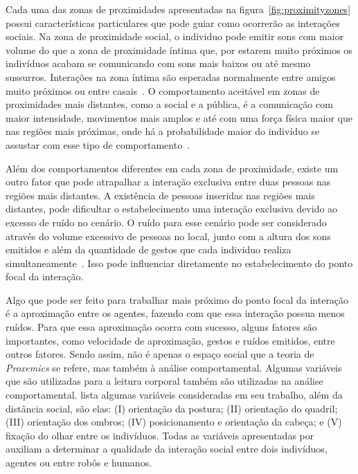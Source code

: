 Cada uma das zonas de proximidades apresentadas na figura~\ref{fig:proximityzones} possui características particulares que pode guiar como ocorrerão as interações sociais. Na zona de proximidade social, o individuo pode emitir sons com maior volume do que a zona de proximidade íntima que, por estarem muito próximos os indivíduos acabam se comunicando com sons mais baixos ou até mesmo sussurros. Interações na zona íntima são esperadas normalmente entre amigos muito próximos ou entre casais~\cite{Hall:1969, Argyle:1988}. O comportamento aceitável em zonas de proximidades mais distantes, como a social e a pública, é a comunicação com maior intensidade, movimentos mais amplos e até com uma força física maior que nas regiões mais próximas, onde há a probabilidade maior do indivíduo se assustar com esse tipo de comportamento~\cite{Henkel:2014}.

Além dos comportamentos diferentes em cada zona de proximidade, existe um outro fator que pode atrapalhar a interação exclusiva entre duas pessoas nas regiões mais distantes. A existência de pessoas inseridas nas regiões mais distantes, pode dificultar o estabelecimento uma interação exclusiva devido ao excesso de ruído no cenário. O ruído para esse cenário pode ser considerado através do volume excessivo de pessoas no local, junto com a altura dos sons emitidos e além da quantidade de gestos que cada individuo realiza simultaneamente~\cite{Walters:2009, Henkel:2014}. Isso pode influenciar diretamente no estabelecimento do ponto focal da interação.

Algo que pode ser feito para trabalhar mais próximo do ponto focal da interação é a aproximação entre os agentes, fazendo com que essa interação possua menos ruídos. Para que essa aproximação ocorra com sucesso, alguns fatores são importantes, como velocidade de aproximação, gestos e ruídos emitidos, entre outros fatores. Sendo assim, não é apenas o espaço social que a teoria de \emph{Proxemics} se refere, mas também à análise comportamental. Algumas variáveis que são utilizadas para a leitura corporal também são utilizadas na análise comportamental.  lista algumas variáveis consideradas em seu trabalho, além da distância social, são elas: (I) orientação da postura; (II) orientação do quadril; (III) orientação dos ombros; (IV) posicionamento e orientação da cabeça; e (V) fixação do olhar entre os indivíduos. Todas as variáveis apresentadas por~ auxiliam a determinar a qualidade da interação social entre dois indivíduos, agentes ou entre robôs e humanos.

